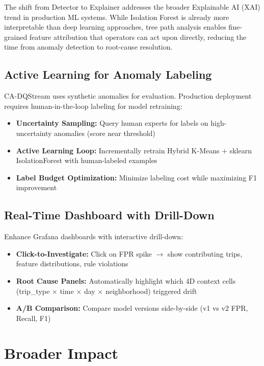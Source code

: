 The shift from Detector to Explainer addresses the broader Explainable AI (XAI) trend in production ML systems. While Isolation Forest is already more interpretable than deep learning approaches, tree path analysis enables fine-grained feature attribution that operators can act upon directly, reducing the time from anomaly detection to root-cause resolution.

\subsection{Active Learning for Anomaly Labeling}

CA-DQStream uses synthetic anomalies for evaluation. Production deployment requires human-in-the-loop labeling for model retraining:
\begin{itemize}
    \item \textbf{Uncertainty Sampling:} Query human experts for labels on high-uncertainty anomalies (score near threshold)
    \item \textbf{Active Learning Loop:} Incrementally retrain Hybrid K-Means + sklearn IsolationForest with human-labeled examples
    \item \textbf{Label Budget Optimization:} Minimize labeling cost while maximizing F1 improvement
\end{itemize}

\subsection{Real-Time Dashboard with Drill-Down}

Enhance Grafana dashboards with interactive drill-down:
\begin{itemize}
    \item \textbf{Click-to-Investigate:} Click on FPR spike $\to$ show contributing trips, feature distributions, rule violations
    \item \textbf{Root Cause Panels:} Automatically highlight which 4D context cells (trip\_type $\times$ time $\times$ day $\times$ neighborhood) triggered drift
    \item \textbf{A/B Comparison:} Compare model versions side-by-side (v1 vs v2 FPR, Recall, F1)
\end{itemize}

\section{Broader Impact}

